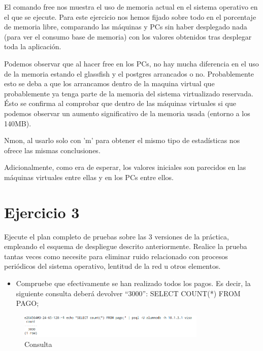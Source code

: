 \documentclass[a4paper, 10pt]{article}
\begin{document}
El comando free nos muestra el uso de memoria actual en el sistema operativo en el que se ejecute. Para este ejercicio nos hemos fijado sobre todo en el porcentaje de memoria libre, comparando las máquinas y PCs sin haber desplegado nada (para ver el consumo base de memoria) con los valores obtenidos tras desplegar toda la aplicación. 

Podemos observar que al hacer free en los PCs, no hay mucha diferencia en el uso de la memoria estando el glassfish y el postgres arrancados o no. Probablemente esto se deba a que los arrancamos dentro de la maquina virtual que probablemente ya tenga parte de la memoria del sistema virtualizado reservada. Ésto se confirma al comprobar que dentro de las máquinas virtuales si que podemos observar un aumento significativo de la memoria usada (entorno a los 140MB).

Nmon, al usarlo solo con 'm' para obtener el mismo tipo de estadísticas nos ofrece las mismas conclusiones.

Adicionalmente, como era de esperar, los valores iniciales son parecidos en las máquinas virtuales entre ellas y en los PCs entre ellos.


\section{Ejercicio 3}
\begin{mdframed} 
Ejecute el plan completo de pruebas sobre las 3 versiones de la práctica, empleando el 
esquema de despliegue descrito anteriormente. Realice la prueba tantas veces como necesite para 
eliminar ruido relacionado con procesos periódicos del sistema operativo, lentitud de la red u otros 
elementos. 

\begin{itemize}
\item Compruebe que efectivamente se han realizado todos los pagos. Es decir, la siguiente 
consulta deberá devolver “3000”:
SELECT COUNT(*) FROM PAGO; 
\end{itemize}  
\end{mdframed}

\begin{figure}[hbtp]
	 	\centering
	 	\includegraphics[width=0.8\textwidth]{../../p2/pantallazos/ej3_select_count.png}
	 	\caption{Consulta}
\end{figure}
\end{document}
